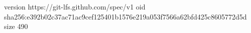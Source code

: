 version https://git-lfs.github.com/spec/v1
oid sha256:e392b02c37ac71ac9cef125401b1576e219a053f7566a62bfd425c8605772d5d
size 490

